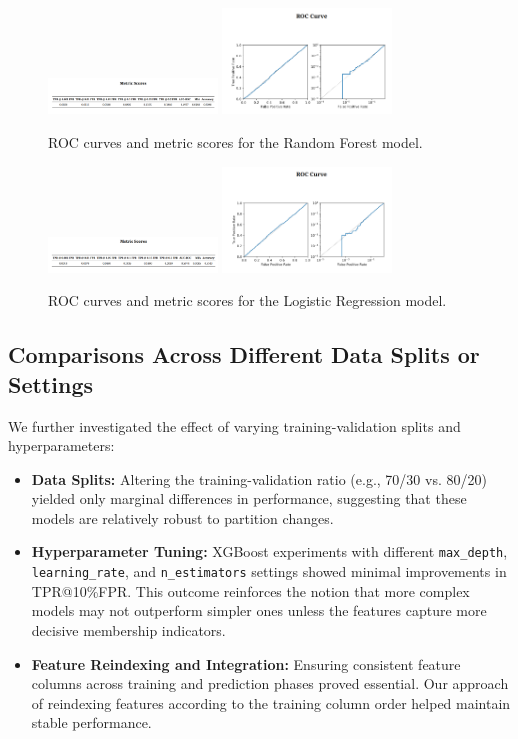 \documentclass[12pt]{article}
\begin{document}
\begin{figure}[h!]
    \centering
    \includegraphics[width=0.4\textwidth]{rf_left.png}
    \includegraphics[width=0.4\textwidth]{rf_right.png}
    \caption{ROC curves and metric scores for the Random Forest model.}
    \label{fig:rf-metrics}
\end{figure}

\begin{figure}[h!]
    \centering
    \includegraphics[width=0.4\textwidth]{lr_left.png}
    \includegraphics[width=0.4\textwidth]{lr_right.png}
    \caption{ROC curves and metric scores for the Logistic Regression model.}
    \label{fig:lr-metrics}
\end{figure}

\subsection{Comparisons Across Different Data Splits or Settings}
We further investigated the effect of varying training-validation splits and hyperparameters:
\begin{itemize}
    \item \textbf{Data Splits:}  
    Altering the training-validation ratio (e.g., 70/30 vs. 80/20) yielded only marginal differences in performance, suggesting that these models are relatively robust to partition changes.

    \item \textbf{Hyperparameter Tuning:}  
    XGBoost experiments with different \texttt{max\_depth}, \texttt{learning\_rate}, and \texttt{n\_estimators} settings showed minimal improvements in TPR@10\%FPR. This outcome reinforces the notion that more complex models may not outperform simpler ones unless the features capture more decisive membership indicators.

    \item \textbf{Feature Reindexing and Integration:}  
    Ensuring consistent feature columns across training and prediction phases proved essential. Our approach of reindexing features according to the training column order helped maintain stable performance.
\end{itemize}
\end{document}
